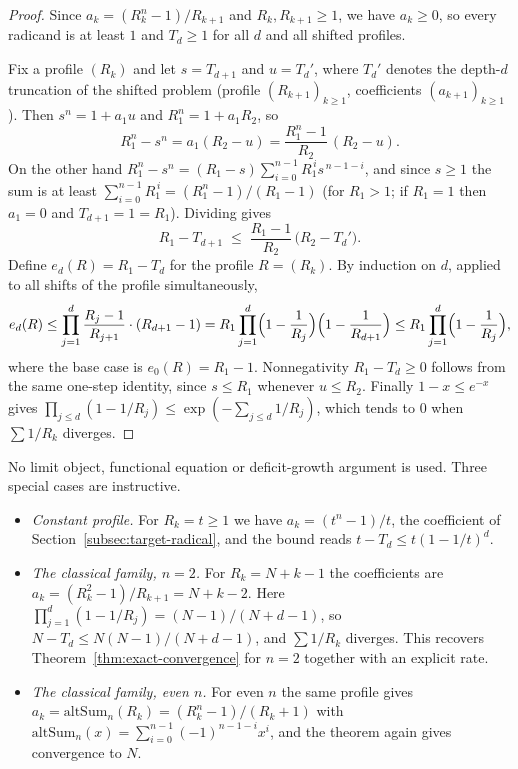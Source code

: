 \documentclass[11pt,a4paper]{amsart}
\theoremstyle{plain}
\theoremstyle{definition}
\theoremstyle{remark}
\begin{document}
\begin{proof}
Since $a_k=(R_k^n-1)/R_{k+1}$ and $R_k,R_{k+1}\ge 1$, we have $a_k\ge 0$, so every radicand is at least $1$ and $T_d\ge 1$ for all $d$ and all shifted profiles.

Fix a profile $(R_k)$ and let $s=T_{d+1}$ and $u=T_d'$, where $T_d'$ denotes the depth-$d$ truncation of the shifted problem (profile $(R_{k+1})_{k\ge 1}$, coefficients $(a_{k+1})_{k\ge 1}$). Then $s^n=1+a_1u$ and $R_1^n=1+a_1R_2$, so
\[
R_1^n-s^n=a_1(R_2-u)=\frac{R_1^n-1}{R_2}\,(R_2-u).
\]
On the other hand $R_1^n-s^n=(R_1-s)\sum_{i=0}^{n-1}R_1^{\,i}s^{\,n-1-i}$, and since $s\ge 1$ the sum is at least $\sum_{i=0}^{n-1}R_1^{\,i}=(R_1^n-1)/(R_1-1)$ (for $R_1>1$; if $R_1=1$ then $a_1=0$ and $T_{d+1}=1=R_1$). Dividing gives
\[
R_1-T_{d+1}\;\le\;\frac{R_1-1}{R_2}\,\bigl(R_2-T_d'\bigr).
\]
Define $e_d(R)=R_1-T_d$ for the profile $R=(R_k)$. By induction on $d$, applied to all shifts of the profile simultaneously,
\[
e_d(R)\le \prod_{j=1}^{d}\frac{R_j-1}{R_{j+1}}\cdot(R_{d+1}-1)
= R_1\prod_{j=1}^{d}\Bigl(1-\frac1{R_j}\Bigr)\Bigl(1-\frac1{R_{d+1}}\Bigr)\le R_1\prod_{j=1}^{d}\Bigl(1-\frac1{R_j}\Bigr),
\]
where the base case is $e_0(R)=R_1-1$. Nonnegativity $R_1-T_d\ge 0$ follows from the same one-step identity, since $s\le R_1$ whenever $u\le R_2$. Finally $1-x\le e^{-x}$ gives $\prod_{j\le d}(1-1/R_j)\le\exp(-\sum_{j\le d}1/R_j)$, which tends to $0$ when $\sum 1/R_k$ diverges. \qedhere
\end{proof}

No limit object, functional equation or deficit-growth argument is used. Three special cases are instructive.

\begin{itemize}
\item \emph{Constant profile.} For $R_k=t\ge 1$ we have $a_k=(t^n-1)/t$, the coefficient of Section~\ref{subsec:target-radical}, and the bound reads $t-T_d\le t(1-1/t)^d$.
\item \emph{The classical family, $n=2$.} For $R_k=N+k-1$ the coefficients are $a_k=(R_k^2-1)/R_{k+1}=N+k-2$. Here $\prod_{j=1}^d(1-1/R_j)=(N-1)/(N+d-1)$, so $N-T_d\le N(N-1)/(N+d-1)$, and $\sum 1/R_k$ diverges. This recovers Theorem~\ref{thm:exact-convergence} for $n=2$ together with an explicit rate.
\item \emph{The classical family, even $n$.} For even $n$ the same profile gives $a_k=\mathrm{altSum}_n(R_k)=(R_k^n-1)/(R_k+1)$ with $\mathrm{altSum}_n(x)=\sum_{i=0}^{n-1}(-1)^{n-1-i}x^i$, and the theorem again gives convergence to $N$.
\end{itemize}
\end{document}
